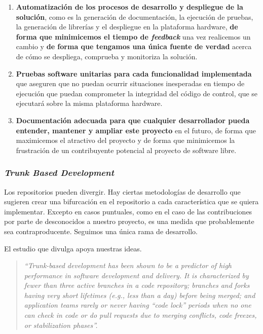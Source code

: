 \begin{enumerate}
    \item \textbf{Automatización de los procesos de desarrollo y despliegue de la solución}, como es
    la generación de documentación, la ejecución de pruebas, la generación de librerías
    y el despliegue en la plataforma hardware, \textbf{de forma que minimicemos el tiempo de \textit{feedback}}
    una vez realicemos un cambio y \textbf{de forma que tengamos una única fuente de verdad} acerca de cómo
    se despliega, comprueba y monitoriza la solución.
    \item \textbf{Pruebas software unitarias para cada funcionalidad implementada} que aseguren que no
    puedan ocurrir situaciones inesperadas en tiempo
    de ejecución que puedan comprometer la integridad del código de control, que se ejecutará sobre
    la misma plataforma hardware.
    \item \textbf{Documentación adecuada para que cualquier desarrollador pueda entender,
    mantener y ampliar este proyecto} en el futuro, de forma que maximicemos el atractivo
    del proyecto y de forma que minimicemos la frustración de un contribuyente potencial
    al proyecto de software libre.
\end{enumerate}

\subsubsection{\textit{Trunk Based Development}}

Los repositorios pueden divergir. Hay ciertas metodologías de desarrollo que
sugieren crear una bifurcación en el repositorio a cada característica que se
quiera implementar. Excepto en casos puntuales, como en el caso de las
contribuciones por parte de desconocidos a nuestro proyecto, es una medida que
probablemente sea contraproducente. Seguimos una única rama de desarrollo.

El estudio que divulga \cite{accelerate} apoya nuestras ideas.

\begin{quote}
    \textit{%
    ``Trunk-based development has been shown to be a predictor of high
    performance in software development and delivery. It is characterized
    by fewer than three active branches in a code repository; branches and
    forks having very short lifetimes (e.g., less than a day) before being
    merged; and application teams rarely or never having “code lock” periods
    when no one can check in code or do pull requests due to merging conflicts,
    code freezes, or stabilization phases''.
    }
\end{quote}

